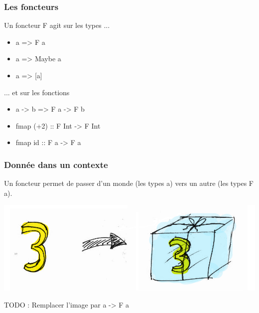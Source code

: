 \documentclass{beamer}
\begin{document}
\begin{frame}
\frametitle{Les foncteurs}
\begin{block}{Un foncteur F agit sur les types ...}
\begin{itemize}
\item a => F a
\end{itemize}
\end{block}
\begin{exampleblock}{}
\begin{itemize}
\item a => Maybe a
\item a => [a]
\end{itemize}
\end{exampleblock}

\pause

\begin{block}{... et sur les fonctions}
\begin{itemize}
\item a -> b => F a -> F b
\end{itemize}
\end{block}

\begin{exampleblock}{}
\begin{itemize}
\item fmap (+2) :: F Int -> F Int
\item fmap id :: F a -> F a
\end{itemize}
\end{exampleblock}
\end{frame}

\begin{frame}
\frametitle{Donnée dans un contexte}

\begin{block}{}
Un foncteur permet de passer d'un monde (les types a) vers un autre (les types F a).
\end{block}

\begin{center}
\includegraphics[scale=0.3]{just3.png}
\end{center}
TODO : Remplacer l'image par a -> F a

\end{frame}
\end{document}
